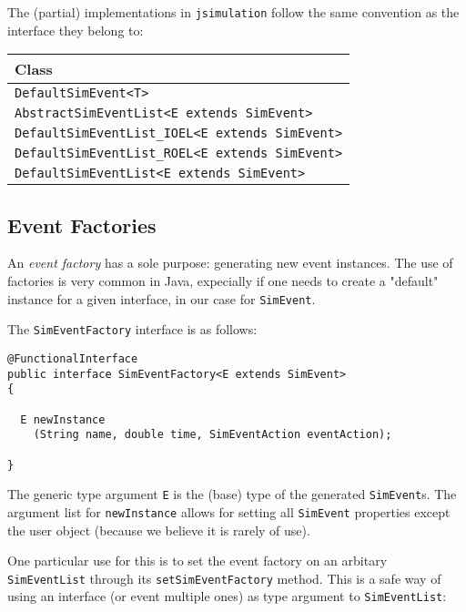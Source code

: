 \documentclass[12pt]{book}
\begin{document}
The (partial) implementations in \lstinline|jsimulation| follow the same convention
  as the interface they belong to:

\begin{tabular}{|l|}
  \hline
  {\bf Class} \\
  \hline
  \lstinline|DefaultSimEvent<T>| \\
  \hline
  \lstinline|AbstractSimEventList<E extends SimEvent>| \\
  \hline
  \lstinline|DefaultSimEventList_IOEL<E extends SimEvent>| \\
  \hline
  \lstinline|DefaultSimEventList_ROEL<E extends SimEvent>| \\
  \hline
  \lstinline|DefaultSimEventList<E extends SimEvent>| \\
  \hline
\end{tabular}

\subsection{Event Factories}

An {\em event factory\/} has a sole purpose: generating new event instances.
The use of factories is very common in Java,
  expecially if one needs to create a "default"
  instance for a given interface,
  in our case for \lstinline-SimEvent-.

The \lstinline|SimEventFactory| interface is as follows:

\begin{lstlisting}[basicstyle=\footnotesize]
@FunctionalInterface
public interface SimEventFactory<E extends SimEvent>
{
  
  E newInstance
    (String name, double time, SimEventAction eventAction);

}
\end{lstlisting}

The generic type argument \lstinline|E| is the (base) type
  of the generated \lstinline|SimEvent|s.
The argument list for \lstinline|newInstance| allows
  for setting all \lstinline|SimEvent| properties except the user object
  (because we believe it is rarely of use).

One particular use for this is to set the event factory
  on an arbitary \lstinline|SimEventList|
  through its \lstinline|setSimEventFactory| method.
This is a safe way of using an interface (or event multiple ones)
  as type argument to \lstinline|SimEventList|:
\end{document}
